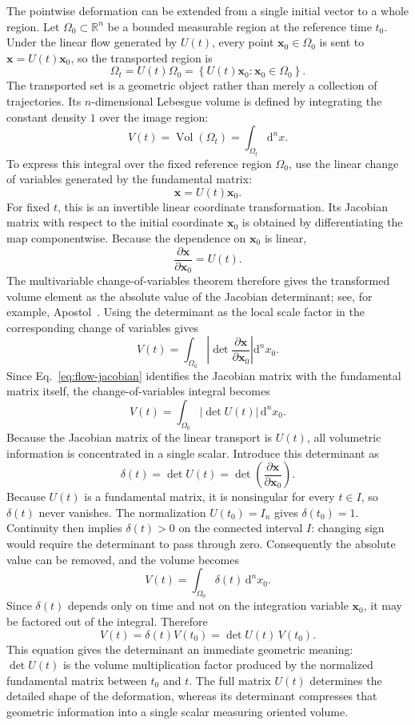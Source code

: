 \documentclass[11pt,a4paper]{article}
\newcommand{\be}{\begin{equation}}
\newcommand{\ee}{\end{equation}}
\newcommand{\lb}[1]{\label{#1}}
\newcommand{\dd}{\mathrm{d}}
\newcommand{\R}{\mathbb{R}}
\DeclareMathOperator{\Vol}{Vol}
\theoremstyle{definition}
\numberwithin{equation}{section}
\begin{document}
The pointwise deformation can be extended from a single initial vector to a whole region. Let $\Omega_0\subset\R^n$ be a bounded measurable region at the reference time $t_0$. Under the linear flow generated by $U(t)$, every point $\mathbf{x}_0\in\Omega_0$ is sent to $\mathbf{x}=U(t)\mathbf{x}_0$, so the transported region is
\be
\Omega_t=U(t)\Omega_0
=\left\{U(t)\mathbf{x}_0:\mathbf{x}_0\in\Omega_0\right\}.
\lb{eq:moving-region}
\ee
The transported set is a geometric object rather than merely a collection of trajectories. Its $n$-dimensional Lebesgue volume is defined by integrating the constant density $1$ over the image region:
\be
V(t)=\Vol(\Omega_t)=\int_{\Omega_t}\dd^n x.
\lb{eq:volume-integral}
\ee
To express this integral over the fixed reference region $\Omega_0$, use the linear change of variables generated by the fundamental matrix:
\be
\mathbf{x}=U(t)\mathbf{x}_0.
\lb{eq:geometric-map}
\ee
For fixed $t$, this is an invertible linear coordinate transformation. Its Jacobian matrix with respect to the initial coordinate $\mathbf{x}_0$ is obtained by differentiating the map componentwise. Because the dependence on $\mathbf{x}_0$ is linear,
\be
\frac{\partial\mathbf{x}}{\partial\mathbf{x}_0}=U(t).
\lb{eq:flow-jacobian}
\ee
The multivariable change-of-variables theorem therefore gives the transformed volume element as the absolute value of the Jacobian determinant; see, for example, Apostol~\cite{apostol1969}. Using the determinant as the local scale factor in the corresponding change of variables gives
\be
V(t)
=
\int_{\Omega_0}
\left|
\det\frac{\partial\mathbf{x}}{\partial\mathbf{x}_0}
\right|
\dd^n x_0.
\lb{eq:volume-change1}
\ee
Since Eq.~\eqref{eq:flow-jacobian} identifies the Jacobian matrix with the fundamental matrix itself, the change-of-variables integral becomes
\be
V(t)
=
\int_{\Omega_0}|\det U(t)|\,\dd^n x_0.
\lb{eq:volume-change2}
\ee
Because the Jacobian matrix of the linear transport is $U(t)$, all volumetric information is concentrated in a single scalar. Introduce this determinant as
\be
\delta(t)=\det U(t)
=
\det\left(\frac{\partial\mathbf{x}}{\partial\mathbf{x}_0}\right).
\lb{eq:phi-volume-factor}
\ee
Because $U(t)$ is a fundamental matrix, it is nonsingular for every $t\in I$, so $\delta(t)$ never vanishes. The normalization $U(t_0)=I_n$ gives $\delta(t_0)=1$. Continuity then implies $\delta(t)>0$ on the connected interval $I$: changing sign would require the determinant to pass through zero. Consequently the absolute value can be removed, and the volume becomes
\be
V(t)=\int_{\Omega_0}\delta(t)\,\dd^n x_0.
\lb{eq:volume-phi}
\ee
Since $\delta(t)$ depends only on time and not on the integration variable $\mathbf{x}_0$, it may be factored out of the integral. Therefore
\be
V(t)=\delta(t)V(t_0)=\det U(t)\,V(t_0).
\lb{eq:volume-intro}
\ee
This equation gives the determinant an immediate geometric meaning: $\det U(t)$ is the volume multiplication factor produced by the normalized fundamental matrix between $t_0$ and $t$. The full matrix $U(t)$ determines the detailed shape of the deformation, whereas its determinant compresses that geometric information into a single scalar measuring oriented volume.
\end{document}
